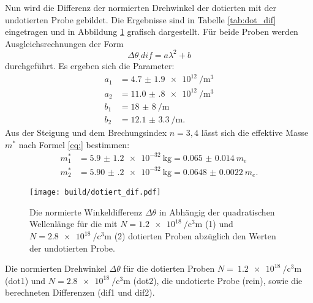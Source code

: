 \noindent Nun wird die Differenz der normierten Drehwinkel der dotierten mit der undotierten Probe gebildet. Die Ergebnisse sind in Tabelle \ref{tab:dot_dif} eingetragen und in Abbildung \ref{fig:dot_dif} grafisch dargestellt.
Für beide Proben werden Ausgleichsrechnungen der Form
\[
\Delta\theta_.{dif}=a\lambda^2+b
\] 
durchgeführt.
Es ergeben sich die Parameter:
\begin{align*}
a_1 &= \SI{4.7(19)e12}{\per\cubic\metre}\\
a_2 &= \SI{11.0(8)e12}{\per\cubic\metre}\\
b_1 &= \SI{18(8)}{\per\metre}\\
b_2 &= \SI{12.1(33)}{\per\metre}\text{.}
\end{align*}
Aus der Steigung und dem Brechungsindex $n=3,4$ \cite{litgas} lässt sich die effektive Masse $m^*$ nach Formel \eqref{eq:} bestimmen:
\begin{align*}
m^*_1 &= \SI{5.9(12)e-32}{\kilogram} = \SI{0.065(14)}{m_e}\\
m^*_2 &= \SI{5.90(20)e-32}{\kilogram} = \SI{0.0648(22)}{m_e}\text{.}
\end{align*}

\begin{figure}
	\centering
	\texttt{[image: build/dotiert\_dif.pdf]}
	\caption{Die normierte Winkeldifferenz $\Delta\theta$ in Abhängig der quadratischen Wellenlänge für die mit $N=\SI{1.2e18}{\per\cubic\centi\metre}$ (1) und $N=\SI{2.8e18}{\per\cubic\centi\metre}$ (2) dotierten Proben abzüglich den Werten der undotierten Probe.}
	\label{fig:dot_dif}
\end{figure}

\begin{table}
	\centering
	\caption{Die normierten Drehwinkel $\Delta\theta$ für die dotierten Proben $N=~\SI{1.2e18}{\per\cubic\centi\metre}$ (dot1) und $N=\SI{2.8e18}{\per\cubic\centi\metre}$ (dot2), die undotierte Probe (rein), sowie die berechneten Differenzen (dif1 und dif2).}
	
	\label{tab:dot_dif}
\end{table}